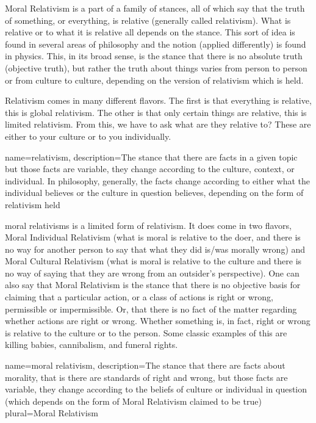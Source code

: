 Moral Relativism is a part of a family of stances, all of which say that the truth of something, or everything, is relative (generally called \Gls{relativism}). What is relative or to what it is relative all depends on the stance. This sort of idea is found in several areas of philosophy and the notion (applied differently) is found in physics. This, in its broad sense, is the stance that there is no absolute truth (objective truth), but rather the truth about things varies from person to person or from culture to culture, depending on the version of relativism which is held.

Relativism comes in many different flavors. The first is that everything is relative, this is global relativism. The other is that only certain things are relative, this is limited relativism. From this, we have to ask what are they relative to? These are either to your culture or to you individually.

{
  name=relativism,
  description={The stance that there are facts in a given topic but those facts are variable, they change according to the culture, context, or individual. In philosophy, generally, the facts change according to either what the individual believes or the culture in question believes, depending on the form of relativism held}
}


\glspl{moral relativism} is a limited form of relativism. It does come in two flavors, Moral Individual Relativism (what is moral is relative to the doer, and there is no way for another person to say that what they did is/was morally wrong) and Moral Cultural Relativism (what is moral is relative to the culture and there is no way of saying that they are wrong from an outsider's perspective). One can also say that Moral Relativism is the stance that there is no objective basis for claiming that a particular action, or a class of actions is right or wrong, permissible or impermissible. Or, that there is no fact of the matter regarding whether actions are right or wrong. Whether something is, in fact, right or wrong is relative to the culture or to the person. Some classic examples of this are killing babies, cannibalism, and funeral rights.

{
  name=moral relativism,
  description={The stance that there are facts about morality, that is there are standards of right and wrong, but those facts are variable, they change according to the beliefs of culture or individual in question (which depends on the form of Moral Relativism claimed to be true)}
plural=Moral Relativism
}


